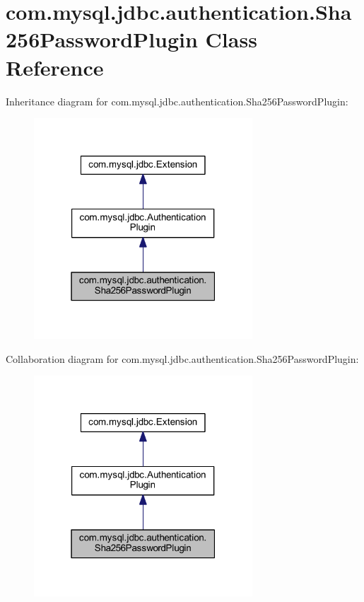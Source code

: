 \hypertarget{classcom_1_1mysql_1_1jdbc_1_1authentication_1_1_sha256_password_plugin}{}\section{com.\+mysql.\+jdbc.\+authentication.\+Sha256\+Password\+Plugin Class Reference}
\label{classcom_1_1mysql_1_1jdbc_1_1authentication_1_1_sha256_password_plugin}


Inheritance diagram for com.\+mysql.\+jdbc.\+authentication.\+Sha256\+Password\+Plugin\+:
\nopagebreak
\begin{figure}[H]
\begin{center}
\leavevmode
\includegraphics[width=232pt]{classcom_1_1mysql_1_1jdbc_1_1authentication_1_1_sha256_password_plugin__inherit__graph}
\end{center}
\end{figure}


Collaboration diagram for com.\+mysql.\+jdbc.\+authentication.\+Sha256\+Password\+Plugin\+:
\nopagebreak
\begin{figure}[H]
\begin{center}
\leavevmode
\includegraphics[width=232pt]{classcom_1_1mysql_1_1jdbc_1_1authentication_1_1_sha256_password_plugin__coll__graph}
\end{center}
\end{figure}
